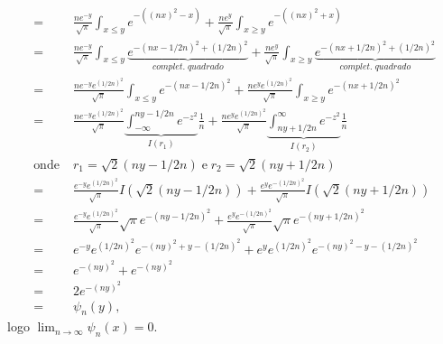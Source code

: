 \documentclass{article}
\begin{document}
\begin{enumerate}
\begin{enumerate}
$$\begin{aligned}
					\\
					= & \frac{ne^{-y}}{\sqrt{\pi}}\int_{x \leq y} e^{-((nx)^{2} -x)}  + \frac{ne^{y}}{\sqrt{\pi}}\int_{x \geq y} e^{-((nx)^{2}+x)}
					\\
					= & \frac{ne^{-y}}{\sqrt{\pi}}\int_{x \leq y} \underbrace{ e^{-(nx - 1/2n)^{2} + (1/2n)^{2} }}_{complet. \; quadrado} + \frac{ne^{y}}{\sqrt{\pi}}\int_{x \geq y} \underbrace{ e^{-(nx + 1/2n)^{2} + (1/2n)^{2}} }_{complet.\;quadrado}
					\\
					= & \frac{ne^{-y}e^{ (1/2n)^{2}}}{\sqrt{\pi}}\int_{x \leq y} e^{-(nx - 1/2n)^{2}} + \frac{ne^{y}e^{ (1/2n)^{2}}}{\sqrt{\pi}}\int_{x \geq y} e^{-(nx + 1/2n)^{2}}
					\\
					= & \frac{ne^{-y}e^{(1/2n)^{2}}}{\sqrt{\pi}} \underbrace{ \int_{-\infty}^{ny-1/2n} e^{-z^{2}} }_{I(r_{1})} \frac{1}{n} + \frac{ne^{y}e^{ (1/2n)^{2}}}{\sqrt{\pi}}
					\underbrace{ \int_{ny+1/2n}^{\infty} e^{-z^{2}} }_{I(r_{2})} \frac{1}{n}
					\\
					\text{onde} \;& r_{1}=\sqrt{2}(ny-1/2n) \; \text{e} \; r_{2}=\sqrt{2}(ny+1/2n)
					\\
					= & \frac{e^{-y}e^{(1/2n)^{2}}}{\sqrt{\pi}} I(\sqrt{2}(ny-1/2n)) + \frac{e^{y}e^{ - (1/2n)^{2}}}{\sqrt{\pi}}I( \sqrt{2}(ny+1/2n))
					\\
					= & \frac{e^{-y}e^{(1/2n)^{2}}}{\sqrt{\pi}} \sqrt{\pi}e^{-(ny-1/2n)^{2}} + \frac{e^{y}e^{ - (1/2n)^{2}}}{\sqrt{\pi}} \sqrt{\pi} e^{-(ny+1/2n)^{2}}
					\\
					= & e^{-y}e^{(1/2n)^{2}} e^{-(ny)^{2}+y - (1/2n)^{2}}+ e^{y}e^{ (1/2n)^{2}}e^{-(ny)^{2}-y - (1/2n)^{2}}
					\\
					= &  e^{-(ny)^{2}}+ e^{-(ny)^{2}}
					\\
					= & 2e^{-(ny)^{2}}
					\\
					= & \psi_{n}(y),
					\end{aligned}
					$$
					logo $\lim_{n \to \infty} \psi_{n}(x) = 0$.
					

\end{enumerate}
\end{enumerate}
\end{document}
